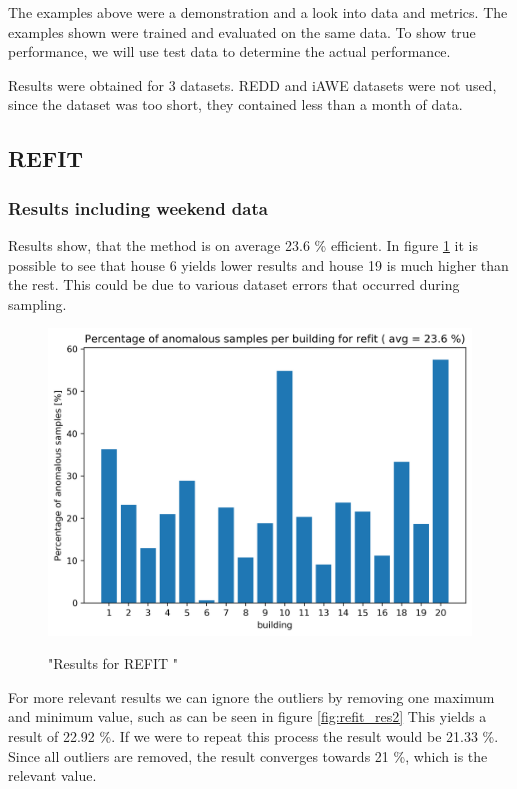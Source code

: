 The examples above were a demonstration and a look into data and metrics. 
The examples shown were trained and evaluated on the same data. 
To show true performance, we will use test data to determine the actual performance. 

Results were obtained for 3 datasets. 
REDD and iAWE datasets were not used, since the dataset was too short, they contained less than a month of data. 


\subsection{REFIT}

\subsubsection{Results including weekend data}
Results show, that the method is on average 23.6 \% efficient. 
In figure \ref{fig:refit_res} it is possible to see that house 6 yields lower results and house 19 is much higher than the rest. 
This could be due to various dataset errors that occurred during sampling.

\begin{figure}[H]
	\centering
	\caption{"Results for REFIT "}
	\includegraphics[width=.8\textwidth]{Figures/EC/refit_res.png}
	\label{fig:refit_res}
\end{figure}

For more relevant results we can ignore the outliers by removing one maximum and minimum value, such as can be seen in figure \ref{fig:refit_res2}
This yields a result of 22.92 \%.
If we were to repeat this process the result would be 21.33 \%.
Since all outliers are removed, the result converges towards 21 \%, which is the relevant value. 

